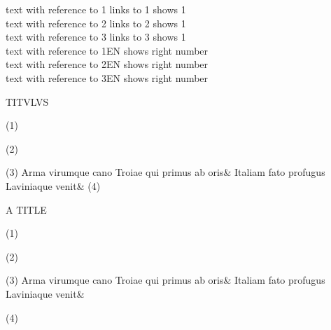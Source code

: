 \documentclass[a4paper,pagesize]{scrbook}
\begin{document}
text with reference to 1 links to 1 shows 1\\
text with reference to 2 links to 2 shows 1\\
text with reference to 3 links to 3 shows 1\\
text with reference to 1EN shows right number\\
text with reference to 2EN shows right number\\
text with reference to 3EN shows right number\\

\begin{pages}
\begin{Leftside}
\setcounter{stanzaindentsrepetition}{1}

\beginnumbering
\pstart
TITVLVS
\pend

\numberpstarttrue
\pstart\noindent(1)\blindtext
\pend

\pstart\noindent(2)\blindtext[3]
\pend

\pstart\noindent(3)\blindtext
\pend
\numberpstartfalse
\stanza
Arma virumque cano Troiae qui primus ab oris&
Italiam fato profugus Laviniaque venit\&
\numberpstarttrue
\pstart\noindent(4)\blindtext
\pend
\endnumbering
\end{Leftside}

\begin{Rightside}
\setcounter{stanzaindentsrepetition}{1}
\beginnumbering
\pstart
A TITLE
\pend

\numberpstarttrue
\pstart\noindent(1)\blindtext
\pend

\pstart\noindent(2)\blindtext[3]
\pend

\pstart\noindent(3)\blindtext
\pend
\numberpstartfalse
\stanza
Arma virumque cano Troiae qui primus ab oris&
Italiam fato profugus Laviniaque venit\&

\numberpstarttrue
\pstart\noindent(4)\blindtext
\pend
\endnumbering
\end{Rightside}
\end{pages}
\Pages
\end{document}
